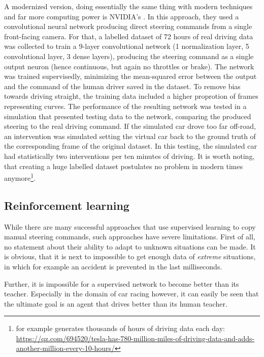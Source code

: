A modernized version, doing essentially the same thing with modern techniques and far more computing power is NVIDIA's \cite{bojarski_end_2016}. In this approach, they used a convolutional neural network producing direct steering commands from a single front-facing camera. For that, a labelled dataset of 72 hours of real driving data was collected to train a 9-layer convolutional network (1 normalization layer, 5 convolutional layer, 3 dense layers), producing the steering command as a single output neuron (hence continuous, but again no throttles or brake). The network was trained supervisedly, minimizing the mean-squared error between the output and the command of the human driver saved in the dataset. To remove bias towards driving straight, the training data included a higher proprotion of frames representing curves. 
The performance of the resulting network was tested in a simulation that presented testing data to the network, comparing the produced steering to the real driving command. If the simulated car drove too far off-road, an intervention was simulated setting the virtual car back to the ground truth of the corresponding frame of the original dataset. In this testing, the simulated car had statistically two interventions per ten minutes of driving. It is worth noting, that creating a huge labelled dataset postulates no problem in modern times anymore\footnote{ for example generates thousands of hours of driving data each day: \url{https://qz.com/694520/tesla-has-780-million-miles-of-driving-data-and-adds-another-million-every-10-hours/}}.


\subsection{Reinforcement learning}

While there are many successful approaches that use supervised learning to copy manual steering commands, such approaches have severe limitations. First of all, no statement about their ability to adapt to unknown situations can be made. It is obvious, that it is next to impossible to get enough data of \textit{extreme} situations, in which for example an accident is prevented in the last milliseconds.

Further, it is impossible for a supervised network to become better than its teacher. Especially in the domain of car racing however, it can easily be seen that the ultimate goal is an agent that drives better than its human teacher.

